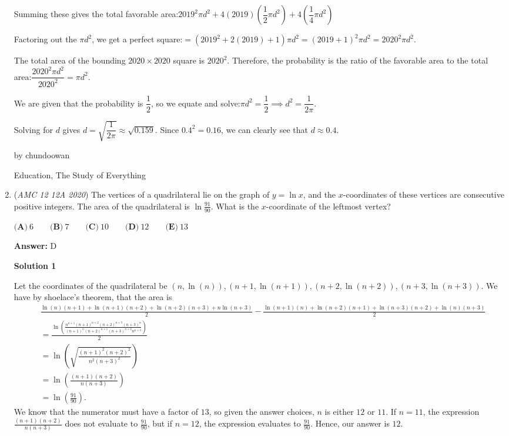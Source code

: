 \begin{enumerate}
 Summing these gives the total favorable area:$2019^2\pi d^2 + 4(2019)\left(\dfrac{1}{2}\pi d^2\right) + 4\left(\dfrac{1}{4}\pi d^2\right)$

 Factoring out the $\pi d^2$, we get a perfect square:$= (2019^2 + 2(2019) + 1)\pi d^2$$= (2019 + 1)^2\pi d^2$$= 2020^2\pi d^2$.

 The total area of the bounding $2020 \times 2020$ square is $2020^2$. Therefore, the probability is the ratio of the favorable area to the total area:$\dfrac{2020^2 \pi d^2}{2020^2} = \pi d^2$.

 We are given that the probability is $\dfrac{1}{2}$, so we equate and solve:$\pi d^2 = \dfrac{1}{2} \implies d^2 = \dfrac{1}{2\pi}$.

 Solving for $d$ gives $d = \sqrt{\dfrac{1}{2\pi}} \approx \sqrt{0.159}$. Since $0.4^2 = 0.16$, we can clearly see that $d \approx 0.4$.

 by chundoowan

 Education, The Study of Everything

 


	\item (\textit{AMC 12 12A 2020}) The vertices of a quadrilateral lie on the graph of $y = \ln x$, and the $x$-coordinates of these vertices are consecutive positive integers. The area of the quadrilateral is $\ln \frac{91}{90}$. What is the $x$-coordinate of the leftmost vertex?


 $\textbf{(A)}\ 6\qquad\textbf{(B)}\ 7\qquad\textbf{(C)}\ 10\qquad\textbf{(D)}\ 12\qquad\textbf{(E)}\ 13$

 \textbf{Answer: }D



\textbf{Solution 1}

Let the coordinates of the quadrilateral be $(n,\ln(n)),(n+1,\ln(n+1)),(n+2,\ln(n+2)),(n+3,\ln(n+3))$. We have by shoelace's theorem, that the area is
 \begin{align*} &\frac{\ln(n)(n+1) + \ln(n+1)(n+2) + \ln(n+2)(n+3)+n\ln(n+3)}{2} - \frac{\ln(n+1)(n) + \ln(n+2)(n+1) + \ln(n+3)(n+2)+\ln(n)(n+3)}{2} \\ &=\frac{\ln \left( \frac{n^{n+1}(n+1)^{n+2}(n+2)^{n+3}(n+3)^n}{(n+1)^n(n+2)^{n+1}(n+3)^{n+2}n^{n+3}}\right)}{2} \\&= \ln \left( \sqrt{\frac{(n+1)^2(n+2)^2}{n^2(n+3)^2}} \right)  \\ &= \ln \left(\frac{(n+1)(n+2)}{n(n+3)}\right) \\ &= \ln \left( \frac{91}{90} \right). \end{align*}
We know that the numerator must have a factor of $13$, so given the answer choices, $n$ is either $12$ or $11$. If $n=11$, the expression $\frac{(n+1)(n+2)}{n(n+3)}$ does not evaluate to $\frac{91}{90}$, but if $n=12$, the expression evaluates to $\frac{91}{90}$. Hence, our answer is $\boxed{12}$.


\end{enumerate}
